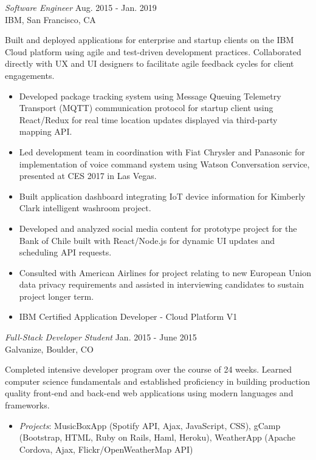 \documentclass{res}
\begin{document}
\begin{resume}
{\sl Software Engineer} \hfill        Aug. 2015 - Jan. 2019 \\
IBM, San Francisco, CA
\begin{changemargin}{0.4cm}{0cm} 
Built and deployed applications for enterprise and startup clients on the IBM Cloud platform using agile and test-driven development practices. Collaborated directly with UX and UI designers to facilitate agile feedback cycles for client engagements.  
\end{changemargin} 
   \begin{itemize} \itemsep -2pt %
   \item Developed package tracking system using Message Queuing Telemetry Transport (MQTT) communication protocol for startup client using React/Redux for real time location updates displayed via third-party mapping API.
   \item Led development team in coordination with Fiat Chrysler and Panasonic for implementation of voice command system using Watson Conversation service, presented at CES 2017 in Las Vegas. 
   \item Built application dashboard integrating IoT device information for Kimberly Clark intelligent washroom project.
   \item Developed and analyzed social media content for prototype project for the Bank of Chile built with React/Node.js for dynamic UI updates and scheduling API requests.
   \item Consulted with American Airlines for project relating to new European Union data privacy requirements and assisted in interviewing candidates to sustain project longer term.
    \item IBM Certified Application Developer - Cloud Platform V1
   \end{itemize}

{\sl Full-Stack Developer Student} \hfill        Jan. 2015 - June 2015 \\
Galvanize, Boulder, CO
\begin{changemargin}{0.4cm}{0cm} 
Completed intensive developer program over the course of 24 weeks. Learned computer science fundamentals and established proficiency in building production quality front-end and back-end web applications using modern languages and frameworks.
\end{changemargin} 
   \begin{itemize} \itemsep -2pt %
   \item \textit{Projects}: MusicBoxApp (Spotify API, Ajax, JavaScript, CSS), gCamp (Bootstrap, HTML, Ruby on Rails, Haml, Heroku), WeatherApp (Apache Cordova, Ajax, Flickr/OpenWeatherMap API)
   \end{itemize}
   

\end{resume}
\end{document}
